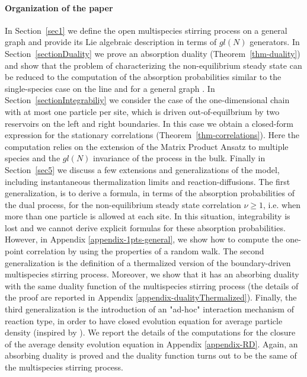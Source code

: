\documentclass[10pt]{article}
\numberwithin{equation}{section}
\numberwithin{equation}{subsection}
\begin{document}
\paragraph{Organization of the paper}
In Section~\ref{sec1} we define the open multispecies stirring
process on a general graph and provide its Lie algebraic description in terms of $gl(N)$ generators. In Section~\ref{sectionDuality} we prove an absorption duality (Theorem~\ref{thm-duality})
and show that the problem of characterizing the non-equilibrium
steady state can be reduced to the computation of the absorption probabilities similar to the single-species case on the line  \cite{KMP} and for a general graph \cite{ frassek2020duality}. 
In Section~\ref{sectionIntegrabiliy}  we consider  the case of the one-dimensional chain with at most one 
particle per site, which is driven out-of-equilbrium by two reservoirs on the left and right boundaries. In this case we obtain a closed-form expression for the stationary correlations (Theorem~\ref{thm-correlations}). Here the computation
relies on the extension of the  Matrix Product Ansatz \cite{derrida1993exact} to multiple species \cite{vanicat2017exact} and the $gl(N)$ invariance of the process in the bulk. Finally in Section~\ref{sec5} we discuss a few extensions 
and generalizations of the model, including instantaneous thermalization limits and reaction-diffusions. {\color{blue} The first generalization, is to derive a formula, in terms of the absorption probabilities of the dual process, for the non-equilibrium steady state correlation $\nu\geq 1$, i.e. when more than one particle is allowed at each site. In this situation, integrability is lost and we cannot derive explicit formulas for these absorption probabilities. However, in Appendix \ref{appendix-1pts-general}, we show how to compute the one-point correlation by using the properties of a random walk.} The second generalization is the definition of a thermalized version of the boundary-driven multispecies stirring process. Moreover, we show that it has an absorbing duality  {\color{blue}with the same duality function of the multispecies stirring process (the details of the proof are reported in Appendix \ref{appendix-dualityThermalized}). Finally, the third generalization is the introduction of an "ad-hoc" interaction mechanism of reaction type, in order to have closed evolution equation for average particle density (inspired by \cite{casini2022uphill,schutzReaction})}. {\color{blue}We report the details of the computations for the closure of the average density evolution equation in Appendix \ref{appendix-RD}}. Again, an absorbing duality is proved and the duality function turns out to be the same of the multispecies stirring process. 
\end{document}
